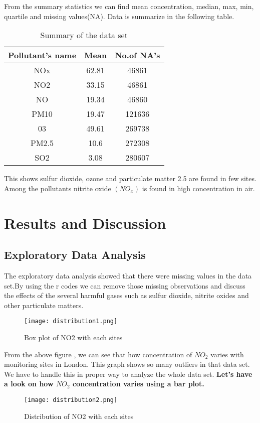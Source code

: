 \documentclass[20pt]{article}
\begin{document}
From the summary statistics we can find mean concentration, median, max, min, quartile and missing values(NA). Data is summarize in the following table.
\begin{table}[h]
	\centering
	\begin{tabular}{|c|c|c|}
		\hline
		Pollutant's name & Mean & No.of NA's \\
		\hline
		NOx & 62.81 & 46861 \\
		\hline
		NO2 & 33.15 & 46861 \\
		\hline
		NO & 19.34 & 46860 \\
		\hline
		PM10 & 19.47 & 121636 \\
		\hline
		03 & 49.61 & 269738 \\
		\hline
		PM2.5 & 10.6 & 272308 \\
		\hline
		SO2 & 3.08 & 280607\\
		\hline
	\end{tabular}
	\caption{Summary of the data set}
	\label{Table1}
\end{table}

This shows sulfur dioxide, ozone and particulate matter 2.5 are found in few sites. Among the pollutants nitrite oxide $(NO_x)$ is found in high concentration in air.

\newpage
\section{Results and Discussion}
\subsection{Exploratory Data Analysis}
\large
The exploratory data analysis showed that there were missing values in the data set.By using the r codes we can remove those missing observations and discuss the effects of the several harmful gases such as sulfur dioxide, nitrite oxides and other particulate matters.

\begin{figure}[h]
	\centering
	\texttt{[image: distribution1.png]}	
	\caption{Box plot of NO2 with each sites}
	\label{Figure_1}
\end{figure}

From the above figure , we can see that how concentration of $NO_2$ varies with monitoring sites in London. This graph shows so many outliers in that data set.
We have to handle this in proper way to analyze the whole data set.
\newpage
\large
\textbf{Let's have a look on how $NO_2$ concentration varies using a bar plot.}
\begin{figure}[h]
	\centering
	\texttt{[image: distribution2.png]}	
	\caption{Distribution of NO2 with each sites}
	\label{Figure_2}
\end{figure}
\end{document}
